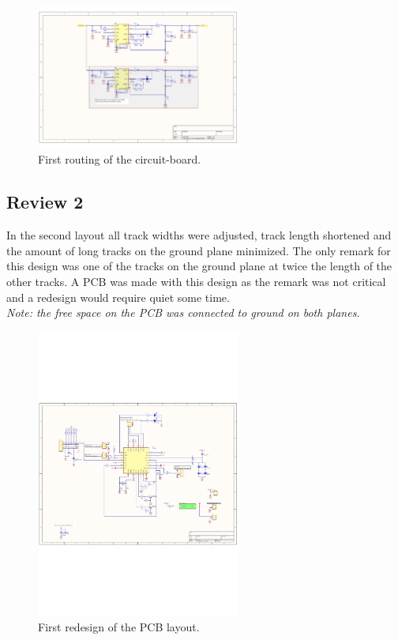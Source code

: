 \begin{figure}[H]
	\begin{centering}
		 \includegraphics[width=0.6\textwidth,page=3,angle=0]{images/SIG60_v0_1}
		\caption{First routing of the circuit-board.}
	\end{centering}
\end{figure}

\subsection{Review 2}
In the second layout all track widths were adjusted, track length shortened and the amount of long tracks on the ground plane minimized. The only remark for this design was one of the tracks on the ground plane at twice the length of the other tracks. A PCB was made with this design as the remark was not critical and a redesign would require quiet some time.
\\\textit{Note: the free space on the PCB was connected to ground on both planes.}
\begin{figure}[H]
	\begin{centering}
		 \includegraphics[width=0.6\textwidth,page=3,angle=0]{images/SIG60_v0_2}
		\caption{First redesign of the PCB layout.}
	\end{centering}
\end{figure}

